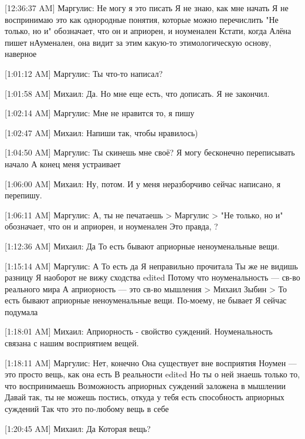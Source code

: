 \documentclass{article}
\begin{document}
[12:36:37 AM] Маргулис:
Не могу я это писать
 Я не знаю, как мне начать
 Я не воспринимаю это как однородные понятия, которые можно перечислить
 "Не только, но и" обозначает, что он и априорен, и ноуменален
 Кстати, когда Алёна пишет нАуменален, она видит за этим какую-то этимологическую основу, наверное

[1:01:12 AM] Маргулис:
Ты что-то написал?

[1:01:58 AM] Михаил:
Да. Но мне еще есть, что дописать. Я не закончил.

[1:02:14 AM] Маргулис:
Мне не нравится то, я пишу

[1:02:47 AM] Михаил:
Напиши так, чтобы нравилось)

[1:04:50 AM] Маргулис:
Ты скинешь мне своё?
 Я могу бесконечно переписывать начало
 А конец меня устраивает

[1:06:00 AM] Михаил:
Ну, потом. И у меня неразборчиво сейчас написано, я перепишу.

[1:06:11 AM] Маргулис:
А, ты не печатаешь
> Маргулис
> "Не только, но и" обозначает, что он и априорен, и ноуменален
Это правда,
 ?

[1:12:36 AM] Михаил:
Да
 То есть бывают априорные неноуменальные вещи.

[1:15:14 AM] Маргулис:
А
 То есть да
 Я неправильно прочитала
 Ты же не видишь разницу
 Я наоборот не вижу сходства
edited 
Потому что ноуменальность — св-во реального мира
 А априорность — это св-во мышления
> Михаил Зыбин
> То есть бывают априорные неноуменальные вещи.
По-моему, не бывает
 Я сейчас подумала

[1:18:01 AM] Михаил:
Априорность - свойство суждений. Ноуменальность связана с нашим восприятием вещей.

[1:18:11 AM] Маргулис:
Нет, конечно
 Она существует вне восприятия
 Ноумен — это просто вещь, как она есть
 В реальности
edited 
Но ты о ней знаешь только то, что воспринимаешь
 Возможность априорных суждений заложена в мышлении
 Давай так, ты не можешь постись, откуда у тебя есть способность априорных суждений
 Так что это по-любому вещь в себе

[1:20:45 AM] Михаил:
Да
 Которая вещь?
\end{document}
